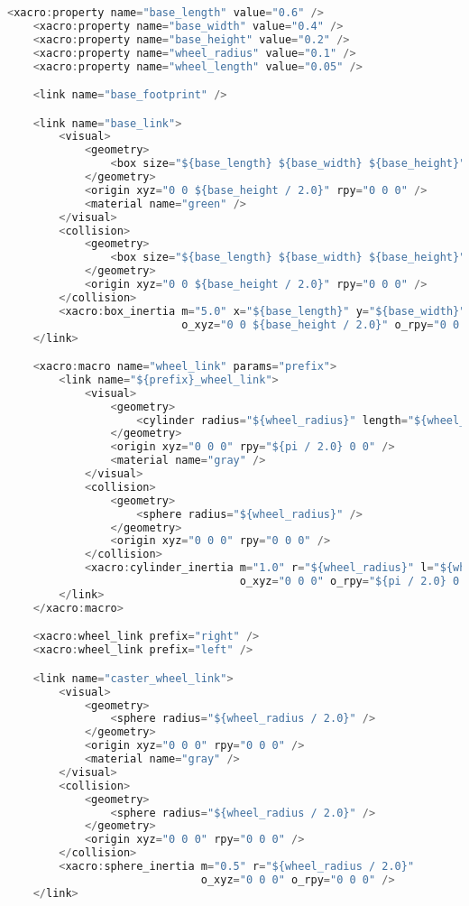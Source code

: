 \documentclass[a4paper,12pt]{article}
\begin{document}
\begin{enumerate}[a)]
{\begin{lstlisting}[language=C++,basicstyle=\fontsize{6.5}{8}\selectfont]
    <xacro:property name="base_length" value="0.6" />
    <xacro:property name="base_width" value="0.4" />
    <xacro:property name="base_height" value="0.2" />
    <xacro:property name="wheel_radius" value="0.1" />
    <xacro:property name="wheel_length" value="0.05" />

    <link name="base_footprint" />

    <link name="base_link">
        <visual>
            <geometry>
                <box size="${base_length} ${base_width} ${base_height}" />
            </geometry>
            <origin xyz="0 0 ${base_height / 2.0}" rpy="0 0 0" />
            <material name="green" />
        </visual>
        <collision>
            <geometry>
                <box size="${base_length} ${base_width} ${base_height}" />
            </geometry>
            <origin xyz="0 0 ${base_height / 2.0}" rpy="0 0 0" />
        </collision>
        <xacro:box_inertia m="5.0" x="${base_length}" y="${base_width}" z="${base_height}"
                           o_xyz="0 0 ${base_height / 2.0}" o_rpy="0 0 0" />
    </link>

    <xacro:macro name="wheel_link" params="prefix">
        <link name="${prefix}_wheel_link">
            <visual>
                <geometry>
                    <cylinder radius="${wheel_radius}" length="${wheel_length}" />
                </geometry>
                <origin xyz="0 0 0" rpy="${pi / 2.0} 0 0" />
                <material name="gray" />
            </visual>
            <collision>
                <geometry>
                    <sphere radius="${wheel_radius}" />
                </geometry>
                <origin xyz="0 0 0" rpy="0 0 0" />
            </collision>
            <xacro:cylinder_inertia m="1.0" r="${wheel_radius}" l="${wheel_length}"
                                    o_xyz="0 0 0" o_rpy="${pi / 2.0} 0 0" />
        </link>
    </xacro:macro>

    <xacro:wheel_link prefix="right" />
    <xacro:wheel_link prefix="left" />

    <link name="caster_wheel_link">
        <visual>
            <geometry>
                <sphere radius="${wheel_radius / 2.0}" />
            </geometry>
            <origin xyz="0 0 0" rpy="0 0 0" />
            <material name="gray" />
        </visual>
        <collision>
            <geometry>
                <sphere radius="${wheel_radius / 2.0}" />
            </geometry>
            <origin xyz="0 0 0" rpy="0 0 0" />
        </collision>
        <xacro:sphere_inertia m="0.5" r="${wheel_radius / 2.0}"
                              o_xyz="0 0 0" o_rpy="0 0 0" />
    </link>


\end{lstlisting}}
\end{enumerate}
\end{document}
